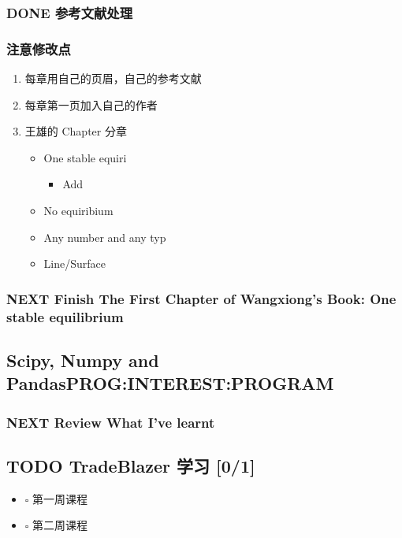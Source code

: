 \documentclass[11pt]{article}
\begin{document}
\subsubsection{{\bfseries\sffamily DONE} 参考文献处理}
\label{sec:orgheadline6}


\subsubsection{注意修改点}
\label{sec:orgheadline7}
\begin{enumerate}
\item 每章用自己的页眉，自己的参考文献
\item 每章第一页加入自己的作者
\item 王雄的 Chapter 分章
\begin{itemize}
\item One stable equiri
\begin{itemize}
\item Add
\end{itemize}
\item No equiribium
\item Any number and any typ
\item Line/Surface
\end{itemize}
\end{enumerate}

\subsubsection{{\bfseries\sffamily NEXT} Finish The First Chapter of Wangxiong's Book: One stable equilibrium}
\label{sec:orgheadline8}

\subsection{Scipy, Numpy and Pandas\hfill{}\textsc{PROG:INTEREST:PROGRAM}}
\label{sec:orgheadline11}

\subsubsection{{\bfseries\sffamily NEXT} Review What I've learnt}
\label{sec:orgheadline10}

\subsection{{\bfseries\sffamily TODO} TradeBlazer 学习 [0/1]}
\label{sec:orgheadline17}
\begin{itemize}
\item $\square$ 第一周课程
\item $\square$ 第二周课程
\end{itemize}
\end{document}
